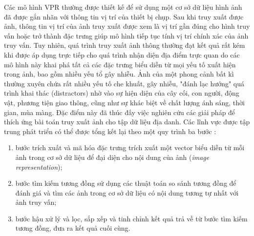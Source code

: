 Các mô hình VPR thường được thiết kế để sử dụng một cơ sở dữ liệu hình ảnh đã được gắn nhãn với thông tin vị trí của thiết bị chụp. Sau khi truy xuất được ảnh, thông tin vị trí của ảnh truy xuất được xem là vị trí gần đúng cho hình truy vấn hoặc trở thành đặc trưng giúp mô hình tiếp tục tính vị trí chính xác của ảnh truy vấn. Tuy nhiên, quá trình truy xuất ảnh thông thường đạt kết quả rất kém khi được áp dụng trực tiếp cho quá trình nhận diện địa điểm trực quan do các mô hình này khai phá tất cả các đặc trưng biểu diễn từ mọi yếu tố xuất hiện trong ảnh, bao gồm nhiều yếu tổ gây nhiễu. Ảnh của một phong cảnh bất kì thường xuyên chứa rất nhiều yếu tố che khuất, gây nhiễu, "đánh lạc hướng" quá trình khai thác (distractors) nhờ vào sự hiện diện của cây cối, con người, động vật, phương tiện giao thông, cũng như sự khác biệt về chất lượng ánh sáng, thời gian, mùa màng. Đặc điểm này đã thúc đấy việc nghiên cứu các giải pháp để thích ứng bài toán truy xuất ảnh cho tập dữ liệu địa danh. Các lĩnh vực được tập trung phát triển có thể được tổng kết lại theo một quy trình ba bước \cite{Masone2021ASO}:

\begin{enumerate}
    \item bước trích xuất và mã hóa đặc trưng trích xuất một vector biểu diễn từ mỗi ảnh trong cơ sở dữ liệu để đại diện cho nội dung của ảnh (\textit{image representation});
    \item bước tìm kiếm tương đồng sử dụng các thuật toán so sánh tương đồng để đánh giá và tìm các ảnh trong cơ sở dữ liệu có nội dung tương tự nhất với ảnh truy vấn;
    \item bước hậu xử lý và lọc, sắp xếp và tinh chỉnh kết quả trả về từ bước tìm kiếm tương đồng, đưa ra kết quả cuối cùng.
\end{enumerate}





% 

% 




